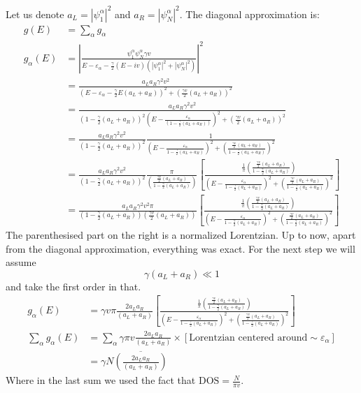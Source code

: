 \documentclass[11pt]{article}
\begin{document}
Let us denote ${a_L = |\psi_1^{\alpha}|^2 }$ and ${a_R = |\psi_N^{\alpha}|^2 }$.
The diagonal approximation is:
\begin{align*} 
g(E)&= \sum_\alpha g_\alpha \\
g_\alpha(E) &= \left|\frac{\psi_1^\alpha\psi_N^\alpha\gamma v}{E-\varepsilon_\alpha - \frac{\gamma}{2}(E-iv)\left(|\psi_1^\alpha|^2+|\psi_N^\alpha|^2\right)}\right|^2\\
&= \frac{a_La_R\gamma^2 v^2}{\left(E-\varepsilon_\alpha - \frac{\gamma}{2}E(a_L+a_R)\right)^2 + \left(\frac{\gamma v}{2}(a_L+a_R)\right)^2}\\
&= \frac{a_La_R\gamma^2 v^2}{\left(1-\frac{\gamma}{2}(a_L+a_R)\right)^2\left(E-\frac{\varepsilon_\alpha}{\left(1-\frac{\gamma}{2}(a_L+a_R)\right)}\right)^2 + \left(\frac{\gamma v}{2}(a_L+a_R)\right)^2}\\
&= \frac{a_La_R\gamma^2 v^2}{\left(1-\frac{\gamma}{2}(a_L+a_R)\right)^2}\frac{1}{\left(E-\frac{\varepsilon_\alpha}{1-\frac{\gamma}{2}(a_L+a_R)}\right)^2 + \left(\frac{\frac{\gamma v}{2}(a_L+a_R)}{1-\frac{\gamma}{2}(a_L+a_R)}\right)^2}\\
&= \frac{a_La_R\gamma^2 v^2}{\left(1-\frac{\gamma}{2}(a_L+a_R)\right)^2}\frac{\pi}{\left(\frac{\frac{\gamma v}{2}(a_L+a_R)}{1-\frac{\gamma}{2}(a_L+a_R)}\right)}\left[\frac{\frac{1}{\pi}\left(\frac{\frac{\gamma v}{2}(a_L+a_R)}{1-\frac{\gamma}{2}(a_L+a_R)}\right)}{\left(E-\frac{\varepsilon_\alpha}{1-\frac{\gamma}{2}(a_L+a_R)}\right)^2 + \left(\frac{\frac{\gamma v}{2}(a_L+a_R)}{1-\frac{\gamma}{2}(a_L+a_R)}\right)^2}\right]\\
&= \frac{a_La_R\gamma^2 v^2\pi}{\left(1-\frac{\gamma}{2}(a_L+a_R)\right)\left(\frac{\gamma v}{2}(a_L+a_R)\right)}
\left[\frac{\frac{1}{\pi}\left(\frac{\frac{\gamma v}{2}(a_L+a_R)}{1-\frac{\gamma}{2}(a_L+a_R)}\right)}{\left(E-\frac{\varepsilon_\alpha}{1-\frac{\gamma}{2}(a_L+a_R)}\right)^2 + \left(\frac{\frac{\gamma v}{2}(a_L+a_R)}{1-\frac{\gamma}{2}(a_L+a_R)}\right)^2}\right]
\end{align*}
%
The parenthesised part on the right is a normalized Lorentzian. 
Up to now, apart from the diagonal approximation, everything was exact.  
For the next step we will assume
\[\gamma(a_L+a_R) \ll 1\]
and take the first order in that. 
\begin{align*}
g_\alpha(E)
&= {\gamma v\pi}\frac{2a_La_R}{(a_L+a_R)}
\left[\frac{\frac{1}{\pi}\left(\frac{\frac{\gamma v}{2}(a_L+a_R)}{1-\frac{\gamma}{2}(a_L+a_R)}\right)}{\left(E-\frac{\varepsilon_\alpha}{1-\frac{\gamma}{2}(a_L+a_R)}\right)^2 + \left(\frac{\frac{\gamma v}{2}(a_L+a_R)}{1-\frac{\gamma}{2}(a_L+a_R)}\right)^2}\right] \\
\sum_\alpha g_\alpha (E) &= \sum_\alpha\gamma \pi v \frac{2a_La_R}{(a_L+a_R)}\times [\textrm{Lorentzian centered around} \sim \varepsilon_\alpha]\\
&= \gamma N\overline{\left(\frac{2a_La_R}{(a_L+a_R)}\right)} 
\end{align*}
Where in the last sum we used the fact that ${\textrm{DOS} = \frac{N}{\pi v}}$.
\end{document}
